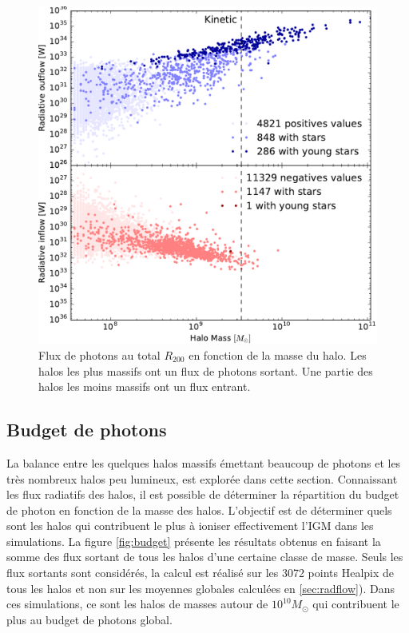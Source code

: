 \begin{figure}
	\includegraphics[height=.30\textheight]{img/03/flux_rad_kinetic.pdf} 
    \caption[Flux de photons au $R_{200}$]{Flux de photons au total $R_{200}$ en fonction de la masse du halo. 
    Les halos les plus massifs ont un flux de photons sortant. 
    Une partie des halos les moins massifs ont un flux entrant.}
 	\label{fig:R200rad}
\end{figure}


\subsection{Budget de photons}
\label{sec:photonbudget}
La balance entre les quelques halos massifs émettant beaucoup de photons et les très nombreux halos peu lumineux, est explorée dans cette section.
Connaissant les flux radiatifs des halos, il est possible de déterminer la répartition du budget de photon en fonction de la masse des halos.
L'objectif est de déterminer quels sont les halos qui contribuent le plus à ioniser effectivement l'\ac{IGM} dans les simulations.
La figure \ref{fig:budget} présente les résultats obtenus en faisant la somme des flux sortant de tous les halos d'une certaine classe de masse.
Seuls les flux sortants sont considérés, la calcul est réalisé sur les 3072 points Healpix de tous les halos et non sur les moyennes globales calculées en \ref{sec:radflow}).
Dans ces simulations, ce sont les halos de masses autour de $10^{10} M_\odot$ qui contribuent le plus au budget de photons global.

